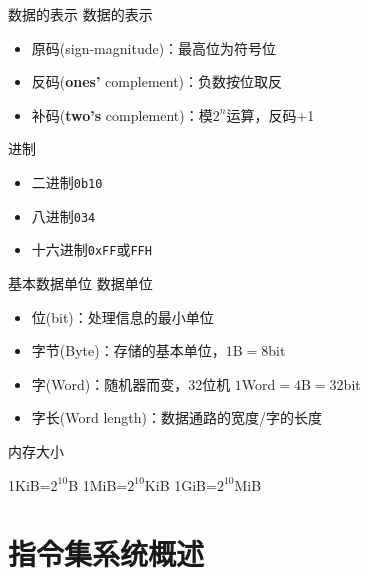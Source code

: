 \documentclass{myslide}
\begin{document}
\begin{frame}[fragile]{数据的表示}
数据的表示
\begin{itemize}
	\item 原码(sign-magnitude)：最高位为符号位
	\item 反码(\textbf{ones'} complement)：负数按位取反
	\item 补码(\textbf{two's} complement)：模$2^n$运算，反码+1
\end{itemize}
进制
\begin{itemize}
	\item 二进制\verb'0b10'
	\item 八进制\verb'034'
	\item 十六进制\verb'0xFF'或\verb'FFH'
\end{itemize}
\end{frame}

\begin{frame}{基本数据单位}
数据单位
\begin{itemize}
	\item 位(bit)：处理信息的最小单位
	\item 字节(Byte)：存储的基本单位，$1$B$=8$bit
	\item 字(Word)：随机器而变，32位机 $1$Word$=4$B$=32$bit
	\item 字长(Word length)：数据通路的宽度/字的长度
\end{itemize}
内存大小\\
\begin{center}
1KiB=$2^{10}$B\qquad
1MiB=$2^{10}$KiB\qquad
1GiB=$2^{10}$MiB
\end{center}
\end{frame}

\section{指令集系统概述}
\begin{frame}
\sectionpage
\end{frame}
\end{document}
